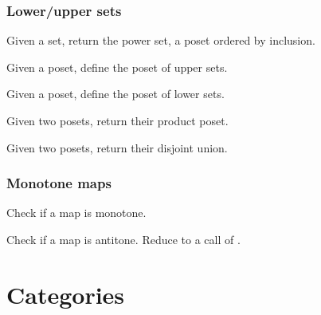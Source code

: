\subsection{Lower/upper sets }
\begin{exercise}
  Given a set, return the power set, a poset ordered by inclusion.

\end{exercise}

\begin{exercise}
  Given a poset, define the poset of upper sets.

\end{exercise}

\begin{exercise}
  Given a poset, define the poset of lower sets.
\end{exercise}




\begin{exercise}
  Given two posets, return their product poset.
\end{exercise}
\begin{exercise}
  Given two posets, return their disjoint union.

\end{exercise}


\subsection{Monotone maps}


\begin{exercise}
  Check if a map is monotone.

\end{exercise}

\begin{exercise}
  Check if a map is antitone. Reduce to a call of .

\end{exercise}

\chapter{Categories}


